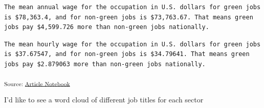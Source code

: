 \documentclass[
  letterpaper,
  DIV=11,
  numbers=noendperiod]{scrartcl}
\newenvironment{Shaded}{\begin{snugshade}}{\end{snugshade}}
\newcommand{\AttributeTok}[1]{\textcolor[rgb]{0.40,0.45,0.13}{#1}}
\newcommand{\ConstantTok}[1]{\textcolor[rgb]{0.56,0.35,0.01}{#1}}
\newcommand{\DecValTok}[1]{\textcolor[rgb]{0.68,0.00,0.00}{#1}}
\newcommand{\FunctionTok}[1]{\textcolor[rgb]{0.28,0.35,0.67}{#1}}
\newcommand{\NormalTok}[1]{\textcolor[rgb]{0.00,0.23,0.31}{#1}}
\newcommand{\SpecialCharTok}[1]{\textcolor[rgb]{0.37,0.37,0.37}{#1}}
\newcommand{\StringTok}[1]{\textcolor[rgb]{0.13,0.47,0.30}{#1}}
\begin{document}
\begin{verbatim}
The mean annual wage for the occupation in U.S. dollars for green jobs is $78,363.4, and for non-green jobs is $73,763.67. That means green jobs pay $4,599.726 more than non-green jobs nationally.
\end{verbatim}

\begin{Shaded}
\end{Shaded}

\begin{verbatim}
The mean hourly wage for the occupation in U.S. dollars for green jobs is $37.67547, and for non-green jobs is $34.79641. That means green jobs pay $2.879063 more than non-green jobs nationally.
\end{verbatim}

\textsubscript{Source:
\href{https://beeckcenter.github.io/climate-equity-workforce/index-preview.html}{Article
Notebook}}

I'd like to see a word cloud of different job titles for each sector
\end{document}

